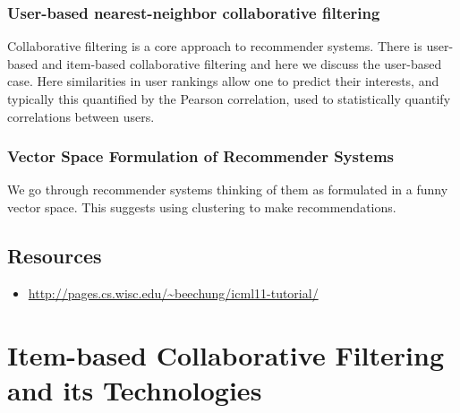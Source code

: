 



\subsubsection{User-based nearest-neighbor collaborative filtering}

Collaborative filtering is a core approach to recommender systems. There
is user-based and item-based collaborative filtering and here we discuss
the user-based case. Here similarities in user rankings allow one to
predict their interests, and typically this quantified by the Pearson
correlation, used to statistically quantify correlations between users.




\subsubsection{Vector Space Formulation of Recommender
Systems}

We go through recommender systems thinking of them as formulated in a
funny vector space. This suggests using clustering to make
recommendations.



\subsection{Resources}

\begin{itemize}

\item
  \url{http://pages.cs.wisc.edu/~beechung/icml11-tutorial/}
\end{itemize}

\section{Item-based Collaborative Filtering and its Technologies}


